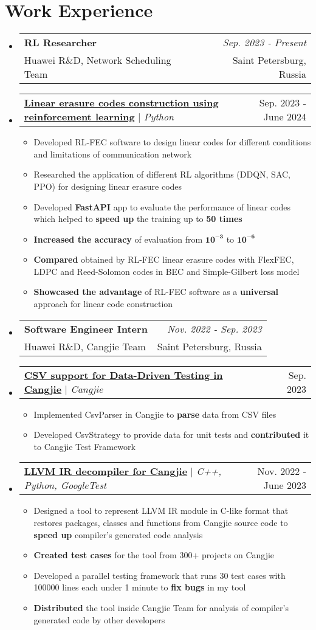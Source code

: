 \documentclass[english,russian,letterpaper,11pt]{article}
\makeatletter
\newcommand{\resumeItem}[1]{
  \item\small{
    {#1 \vspace{-2pt}}
  }
}
\newcommand{\resumeWorkExpHeading}[4]{
  \vspace{-2pt}\item
    \begin{tabular*}{0.97\textwidth}[t]{l@{\extracolsep{\fill}}r}
      \textbf{#1} & \textit{#2} \\
      #3 & #4 \\
    \end{tabular*}\vspace{-7pt}
}
\newcommand{\resumeProjectHeading}[2]{
    \item
    \begin{tabular*}{0.97\textwidth}{l@{\extracolsep{\fill}}r}
      \small#1 & #2 \\
    \end{tabular*}\vspace{-7pt}
}
\newcommand{\resumeSubHeadingListStart}{\begin{itemize}[leftmargin=0.15in, label={}]}
\newcommand{\resumeSubHeadingListEnd}{\end{itemize}}
\newcommand{\resumeItemListStart}{\begin{itemize}}
\newcommand{\resumeItemListEnd}{\end{itemize}\vspace{-5pt}}
\makeatother
\begin{document}
\section{Work Experience}
    \resumeSubHeadingListStart
    \resumeWorkExpHeading
      {RL Researcher}{Sep. 2023 - Present}
      {Huawei R\&D, Network Scheduling Team}{Saint Petersburg, Russia}
    \resumeProjectHeading
          {\underline{\textbf{Linear erasure codes construction using reinforcement learning}} $|$ \emph{Python}}{Sep. 2023 - June 2024}
          \resumeItemListStart
            \resumeItem{Developed RL-FEC software to design linear codes for different conditions and limitations of communication network}
            \resumeItem{Researched the application of different RL algorithms (DDQN, SAC, PPO) for designing linear erasure codes}
            \resumeItem{Developed \textbf{FastAPI} app to evaluate the performance of linear codes which helped to \textbf{speed up} the training up to \textbf{50 times}}
            \resumeItem{\textbf{Increased the accuracy} of evaluation from $\mathbf{10^{-3}}$ to $\mathbf{10^{-6}}$}
            \resumeItem{\textbf{Compared} obtained by RL-FEC linear erasure codes with FlexFEC, LDPC and Reed-Solomon codes in BEC and Simple-Gilbert loss model}
            \resumeItem{\textbf{Showcased the advantage} of RL-FEC software as a \textbf{universal} approach for linear code construction}
          \resumeItemListEnd  
    \resumeWorkExpHeading
      {Software Engineer Intern}{Nov. 2022 - Sep. 2023}
      {Huawei R\&D, Cangjie Team}{Saint Petersburg, Russia}
    \resumeProjectHeading
          {\underline{\textbf{CSV support for Data-Driven Testing in Cangjie}} $|$ \emph{Cangjie}}{Sep. 2023}
          \resumeItemListStart
            \resumeItem{Implemented CsvParser in Cangjie to \textbf{parse} data from CSV files}
            \resumeItem{Developed CsvStrategy to provide data for unit tests and \textbf{contributed} it to Cangjie Test Framework}
          \resumeItemListEnd
    \resumeProjectHeading
          {\underline{\textbf{LLVM IR decompiler for Cangjie}} $|$ \emph{C++, Python, GoogleTest}}{Nov. 2022 - June 2023}
          \resumeItemListStart
            \resumeItem{Designed a tool to represent LLVM IR module in C-like format that restores packages, classes and functions from Cangjie source code to \textbf{speed up} compiler's generated code analysis}
            \resumeItem{\textbf{Created test cases} for the tool from 300+ projects on Cangjie}
            \resumeItem{Developed a parallel testing framework that runs 30 test cases with 100000 lines each under 1 minute to \textbf{fix bugs} in my tool}
            \resumeItem{\textbf{Distributed} the tool inside Cangjie Team for analysis of compiler's generated code by other developers}
          \resumeItemListEnd
    \resumeSubHeadingListEnd
\end{document}
